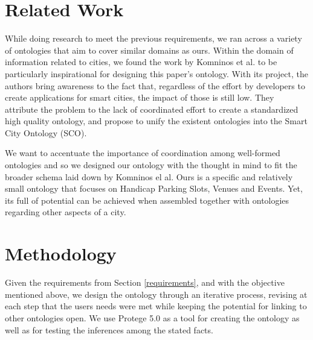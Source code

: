 \documentclass[runningheads,a4paper]{../../StyleFiles/llncs}
\begin{document}
\section{Related Work}
While doing research to meet the previous requirements, we ran across a variety of ontologies that aim to cover similar domains as ours. Within the domain of information related to cities, we found the work by Komninos et al.\cite{komninos2015smart} to be particularly inspirational for designing this paper's ontology. With its project, the authors bring awareness to the fact that, regardless of the effort by developers to create applications for smart cities, the impact of those is still low. They attribute the problem to the lack of coordinated effort to create a standardized high quality ontology, and propose to unify the existent ontologies into the Smart City Ontology (SCO).   %

We want to accentuate the importance of coordination among well-formed ontologies and so we designed our ontology with the thought in mind to fit the broader schema laid down by Komninos el al. Ours is a specific and relatively small ontology that focuses on Handicap Parking Slots, Venues and Events. Yet, its full of potential can be achieved when assembled together with ontologies regarding other aspects of a city. 


\section{Methodology}

Given the requirements from Section \ref{requirements}, and with the objective mentioned above, we design the ontology through an iterative process, revising at each step that the users needs were met while keeping the potential for linking to other ontologies open. We use Protege 5.0 as a tool for creating the ontology as well as for testing the inferences among the stated facts. 
\end{document}
